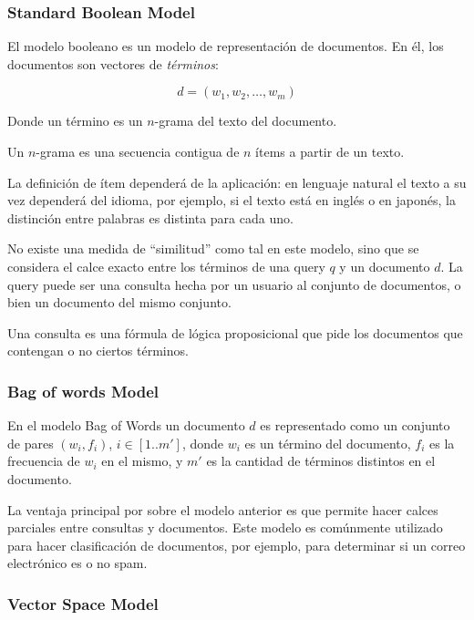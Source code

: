     \subsubsection{Standard Boolean Model}

    El modelo booleano es un modelo de representación de
    documentos. En él, los documentos son vectores de \emph{términos}:

    $$d = (w_1,w_2,\ldots,w_m)$$

    Donde un término es un $n$-grama del texto del documento.

    \begin{defn} Un $n$-grama es una secuencia contigua de $n$ ítems a
    partir de un texto. \end{defn}

    La definición de ítem dependerá de la aplicación: en lenguaje
    natural el texto a su vez dependerá del idioma, por ejemplo, si el
    texto está en inglés o en japonés, la distinción entre palabras
    es distinta para cada uno.

    No existe una medida de ``similitud'' como tal en este modelo, sino
    que se considera el calce exacto entre los términos de una query
    $q$ y un documento $d$. La query puede ser una consulta hecha por
    un usuario al conjunto de documentos, o bien un documento del
    mismo conjunto.

    Una consulta es una fórmula de lógica proposicional que pide los
    documentos que contengan o no ciertos términos.

    \subsubsection{Bag of words Model}

    En el modelo Bag of Words un documento $d$ es representado como un
    conjunto de pares $(w_i, f_i)$, $i\in[1..m']$, donde $w_i$ es un
    término del documento, $f_i$ es la frecuencia de $w_i$ en el
    mismo, y $m'$ es la cantidad de términos distintos en el
    documento.

    La ventaja principal por sobre el modelo anterior es que permite
    hacer calces parciales entre consultas y documentos. Este modelo
    es comúnmente utilizado para hacer clasificación de documentos,
    por ejemplo, para determinar si un correo electrónico es o no
    spam.

    \subsubsection{Vector Space Model}

